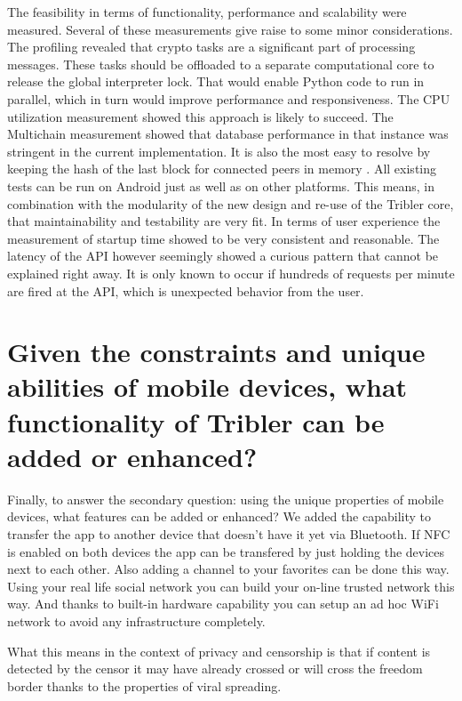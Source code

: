 The feasibility in terms of functionality, performance and scalability were measured.
Several of these measurements give raise to some minor considerations.
The profiling revealed that crypto tasks are a significant part of processing messages.
These tasks should be offloaded to a separate computational core to release the global interpreter lock.
That would enable Python code to run in parallel, which in turn would improve performance and responsiveness.
The CPU utilization measurement showed this approach is likely to succeed.
The Multichain measurement showed that database performance in that instance was stringent in the current implementation.
It is also the most easy to resolve by keeping the hash of the last block for connected peers in memory .
All existing tests can be run on Android just as well as on other platforms.
This means, in combination with the modularity of the new design and re-use of the Tribler core, that maintainability and testability are very fit.
In terms of user experience the measurement of startup time showed to be very consistent and reasonable.
The latency of the API however seemingly showed a curious pattern that cannot be explained right away.
It is only known to occur if hundreds of requests per minute are fired at the API, which is unexpected behavior from the user.


\section{Given the constraints and unique abilities of mobile devices, what functionality of Tribler can be added or enhanced?}

Finally, to answer the secondary question: using the unique properties of mobile devices, what features can be added or enhanced?
We added the capability to transfer the app to another device that doesn't have it yet via Bluetooth.
If NFC is enabled on both devices the app can be transfered by just holding the devices next to each other.
Also adding a channel to your favorites can be done this way.
Using your real life social network you can build your on-line trusted network this way.
And thanks to built-in hardware capability you can setup an ad hoc WiFi network to avoid any infrastructure completely.


What this means in the context of privacy and censorship is that if content is detected by the censor it may have already crossed or will cross the freedom border thanks to the properties of viral spreading.

